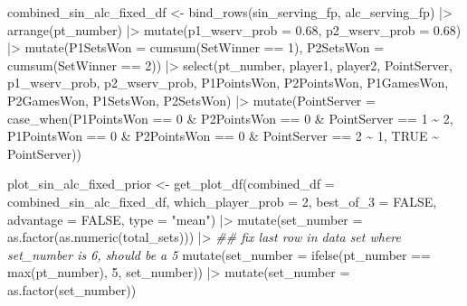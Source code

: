 \documentclass[
  letterpaper,
  DIV=11,
  numbers=noendperiod]{scrartcl}
\newenvironment{Shaded}{\begin{snugshade}}{\end{snugshade}}
\newcommand{\AttributeTok}[1]{\textcolor[rgb]{0.40,0.45,0.13}{#1}}
\newcommand{\ConstantTok}[1]{\textcolor[rgb]{0.56,0.35,0.01}{#1}}
\newcommand{\DecValTok}[1]{\textcolor[rgb]{0.68,0.00,0.00}{#1}}
\newcommand{\DocumentationTok}[1]{\textcolor[rgb]{0.37,0.37,0.37}{\textit{#1}}}
\newcommand{\FloatTok}[1]{\textcolor[rgb]{0.68,0.00,0.00}{#1}}
\newcommand{\FunctionTok}[1]{\textcolor[rgb]{0.28,0.35,0.67}{#1}}
\newcommand{\NormalTok}[1]{\textcolor[rgb]{0.00,0.23,0.31}{#1}}
\newcommand{\OtherTok}[1]{\textcolor[rgb]{0.00,0.23,0.31}{#1}}
\newcommand{\SpecialCharTok}[1]{\textcolor[rgb]{0.37,0.37,0.37}{#1}}
\newcommand{\StringTok}[1]{\textcolor[rgb]{0.13,0.47,0.30}{#1}}
\begin{document}
\begin{Shaded}
\begin{Highlighting}[]
\NormalTok{combined\_sin\_alc\_fixed\_df }\OtherTok{\textless{}{-}} \FunctionTok{bind\_rows}\NormalTok{(sin\_serving\_fp, alc\_serving\_fp) }\SpecialCharTok{|\textgreater{}}
    \FunctionTok{arrange}\NormalTok{(pt\_number) }\SpecialCharTok{|\textgreater{}}
  \FunctionTok{mutate}\NormalTok{(}\AttributeTok{p1\_wserv\_prob =} \FloatTok{0.68}\NormalTok{,}
         \AttributeTok{p2\_wserv\_prob =} \FloatTok{0.68}\NormalTok{) }\SpecialCharTok{|\textgreater{}}
  \FunctionTok{mutate}\NormalTok{(}\AttributeTok{P1SetsWon =} \FunctionTok{cumsum}\NormalTok{(SetWinner }\SpecialCharTok{==} \DecValTok{1}\NormalTok{),}
           \AttributeTok{P2SetsWon =} \FunctionTok{cumsum}\NormalTok{(SetWinner }\SpecialCharTok{==} \DecValTok{2}\NormalTok{)) }\SpecialCharTok{|\textgreater{}}
  \FunctionTok{select}\NormalTok{(pt\_number, player1, player2, PointServer, p1\_wserv\_prob, p2\_wserv\_prob,}
\NormalTok{         P1PointsWon, P2PointsWon, P1GamesWon, P2GamesWon, P1SetsWon, P2SetsWon) }\SpecialCharTok{|\textgreater{}}
  \FunctionTok{mutate}\NormalTok{(}\AttributeTok{PointServer =} \FunctionTok{case\_when}\NormalTok{(P1PointsWon }\SpecialCharTok{==} \DecValTok{0} \SpecialCharTok{\&} 
\NormalTok{                                   P2PointsWon }\SpecialCharTok{==} \DecValTok{0} \SpecialCharTok{\&} 
\NormalTok{                                   PointServer }\SpecialCharTok{==} \DecValTok{1} \SpecialCharTok{\textasciitilde{}} \DecValTok{2}\NormalTok{,}
\NormalTok{                                 P1PointsWon }\SpecialCharTok{==} \DecValTok{0} \SpecialCharTok{\&} 
\NormalTok{                                   P2PointsWon }\SpecialCharTok{==} \DecValTok{0} \SpecialCharTok{\&} 
\NormalTok{                                   PointServer }\SpecialCharTok{==} \DecValTok{2} \SpecialCharTok{\textasciitilde{}} \DecValTok{1}\NormalTok{,}
                                 \ConstantTok{TRUE} \SpecialCharTok{\textasciitilde{}}\NormalTok{ PointServer))}

\NormalTok{plot\_sin\_alc\_fixed\_prior }\OtherTok{\textless{}{-}} \FunctionTok{get\_plot\_df}\NormalTok{(}\AttributeTok{combined\_df =}\NormalTok{ combined\_sin\_alc\_fixed\_df, }
                        \AttributeTok{which\_player\_prob =} \DecValTok{2}\NormalTok{,}
                        \AttributeTok{best\_of\_3 =} \ConstantTok{FALSE}\NormalTok{,}
                        \AttributeTok{advantage =} \ConstantTok{FALSE}\NormalTok{,}
                        \AttributeTok{type =} \StringTok{"mean"}\NormalTok{) }\SpecialCharTok{|\textgreater{}}
  \FunctionTok{mutate}\NormalTok{(}\AttributeTok{set\_number =} \FunctionTok{as.factor}\NormalTok{(}\FunctionTok{as.numeric}\NormalTok{(total\_sets))) }\SpecialCharTok{|\textgreater{}}
  \DocumentationTok{\#\# fix last row in data set where set\_number is 6, should be a 5}
  \FunctionTok{mutate}\NormalTok{(}\AttributeTok{set\_number =} \FunctionTok{ifelse}\NormalTok{(pt\_number }\SpecialCharTok{==} \FunctionTok{max}\NormalTok{(pt\_number), }\StringTok{\textquotesingle{}5\textquotesingle{}}\NormalTok{, set\_number)) }\SpecialCharTok{|\textgreater{}}
  \FunctionTok{mutate}\NormalTok{(}\AttributeTok{set\_number =} \FunctionTok{as.factor}\NormalTok{(set\_number))}
\end{Highlighting}
\end{Shaded}
\end{document}
